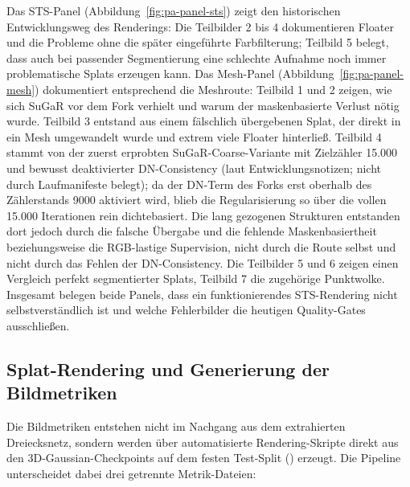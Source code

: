 Das STS-Panel (Abbildung~\ref{fig:pa-panel-sts}) zeigt den historischen
Entwicklungsweg des Renderings: Die Teilbilder 2 bis 4 dokumentieren Floater
und die Probleme ohne die später eingeführte Farbfilterung; Teilbild 5 belegt,
dass auch bei passender Segmentierung eine schlechte Aufnahme noch immer
problematische Splats erzeugen kann. Das Mesh-Panel
(Abbildung~\ref{fig:pa-panel-mesh}) dokumentiert entsprechend die Meshroute:
Teilbild 1 und 2 zeigen, wie sich SuGaR vor dem Fork verhielt und warum der
maskenbasierte Verlust nötig wurde. Teilbild 3 entstand aus einem fälschlich
übergebenen Splat, der direkt in ein Mesh umgewandelt wurde und extrem viele
Floater hinterließ. Teilbild 4 stammt von der zuerst erprobten
SuGaR-Coarse-Variante mit Zielzähler 15.000 und bewusst deaktivierter
DN-Consistency (laut Entwicklungsnotizen; nicht durch Laufmanifeste belegt);
da der DN-Term des Forks erst oberhalb des Zählerstands 9000
aktiviert wird, blieb die Regularisierung so über die vollen 15.000
Iterationen rein dichtebasiert. Die lang gezogenen Strukturen entstanden dort
jedoch durch die falsche Übergabe und die fehlende Maskenbasiertheit
beziehungsweise die RGB-lastige Supervision, nicht durch die Route selbst und
nicht durch das Fehlen der DN-Consistency. Die Teilbilder 5 und 6
zeigen einen Vergleich perfekt segmentierter Splats, Teilbild 7 die
zugehörige Punktwolke. Insgesamt belegen beide Panels, dass ein
funktionierendes STS-Rendering nicht selbstverständlich ist und welche
Fehlerbilder die heutigen Quality-Gates ausschließen.
\subsection{Splat-Rendering und Generierung der Bildmetriken}

Die Bildmetriken entstehen nicht im Nachgang aus dem extrahierten Dreiecksnetz,
sondern werden über automatisierte Rendering-Skripte direkt aus den
3D-Gaussian-Checkpoints auf dem festen Test-Split ()
erzeugt. Die Pipeline unterscheidet dabei drei getrennte Metrik-Dateien:

